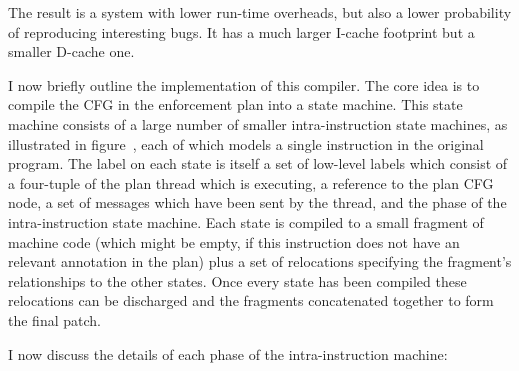 The result is a system with lower run-time overheads, but also a lower probability of reproducing interesting bugs.
It has a much larger I-cache footprint but a smaller D-cache one.

I now briefly outline the implementation of this compiler.
The core idea is to compile the CFG in the enforcement plan into a state machine.
This state machine consists of a large number of smaller intra-instruction state machines, as illustrated in figure~, each of which models a single instruction in the original program.
The label on each state is itself a set of low-level labels which consist of a four-tuple of the plan thread which is executing, a reference to the plan CFG node, a set of messages which have been sent by the thread, and the phase of the intra-instruction state machine.
Each state is compiled to a small fragment of machine code (which might be empty, if this instruction does not have an relevant annotation in the plan) plus a set of relocations specifying the fragment's relationships to the other states.
Once every state has been compiled these relocations can be discharged and the fragments concatenated together to form the final patch.

I now discuss the details of each phase of the intra-instruction machine:

